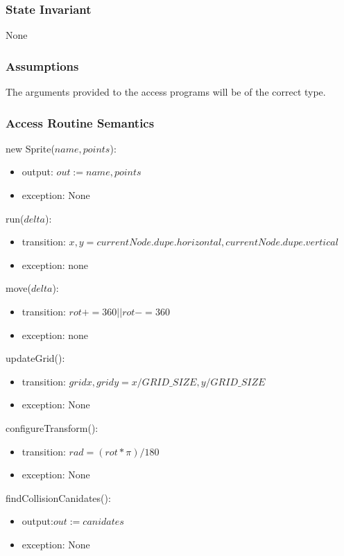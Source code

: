 \documentclass[12pt]{article}
\begin{document}
\subsubsection* {State Invariant}
None

\subsubsection* {Assumptions}

The arguments provided to the access programs will be of the correct type.

\subsubsection* {Access Routine Semantics}

\noindent new Sprite($name, points$):
\begin{itemize}
\item output: $out := name, points$
\item exception: None
\end{itemize}

\noindent run($delta$):
\begin{itemize}
\item transition: $x,y = currentNode.dupe.horizontal, currentNode.dupe.vertical$
\item exception: none
\end{itemize}

\noindent move($delta$):
\begin{itemize}
\item transition: $rot += 360 || rot -= 360$
\item exception: none
\end{itemize}

\noindent updateGrid():
\begin{itemize}
\item transition: $gridx, gridy = x / GRID\_SIZE, y / GRID\_SIZE$
\item exception: None
\end{itemize}

\noindent configureTransform():
\begin{itemize}
\item transition: $rad = (rot * \pi)/180$
\item exception: None
\end{itemize}

\noindent findCollisionCanidates():
\begin{itemize}
\item output:$out := canidates$
\item exception: None
\end{itemize}
\end{document}
